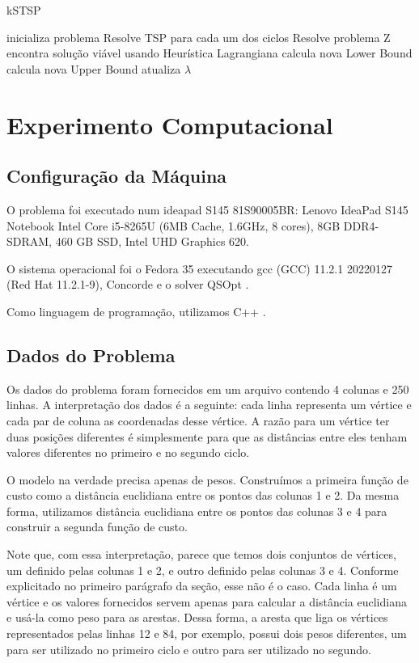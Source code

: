 \documentclass{article}
\newcommand{\lagrange}{\ensuremath{\lambda}}
\begin{document}
\begin{algorithm}
\caption{kSTSP}
\begin{algorithmic}
    \State inicializa problema
    \State Resolve TSP para cada um dos ciclos
    \State Resolve problema Z
    \State encontra solução viável usando Heurística Lagrangiana
    \State calcula nova Lower Bound
    \State calcula nova Upper Bound
    \State atualiza $\lagrange$
    \EndWhile
\end{algorithmic}
\end{algorithm}

\section{Experimento Computacional}

\subsection{Configuração da Máquina}

O problema foi executado num ideapad S145 81S90005BR: Lenovo IdeaPad S145 Notebook Intel Core i5-8265U (6MB Cache, 1.6GHz, 8 cores), 8GB DDR4-SDRAM, 460 GB SSD, Intel UHD Graphics 620.

O sistema operacional foi o Fedora 35 executando gcc (GCC) 11.2.1 20220127 (Red Hat 11.2.1-9), Concorde \cite{bib:concorde} e o solver QSOpt \cite{bib:qsopt}.

Como linguagem de programação, utilizamos C++ \cite{bib:cpp}.


\subsection{Dados do Problema}

Os dados do problema foram fornecidos em um arquivo contendo 4 colunas e 250 linhas. A interpretação dos dados é a seguinte: cada linha representa um vértice e cada par de coluna as coordenadas desse vértice. A razão para um vértice ter duas posições diferentes é simplesmente para que as distâncias entre eles tenham valores diferentes no primeiro e no segundo ciclo.

O modelo na verdade precisa apenas de pesos. Construímos a primeira função de custo como a distância euclidiana entre os pontos das colunas 1 e 2. Da mesma forma, utilizamos distância euclidiana entre os pontos das colunas 3 e 4 para construir a segunda função de custo.

Note que, com essa interpretação, parece que temos dois conjuntos de vértices, um definido pelas colunas 1 e 2, e outro definido pelas colunas 3 e 4. Conforme explicitado no primeiro parágrafo da seção, esse não é o caso. Cada linha é um vértice e os valores fornecidos servem apenas para calcular a distância euclidiana e usá-la como peso para as arestas. Dessa forma, a aresta que liga os vértices representados pelas linhas 12 e 84, por exemplo, possui dois pesos diferentes, um para ser utilizado no primeiro ciclo e outro para ser utilizado no segundo.
\end{document}
